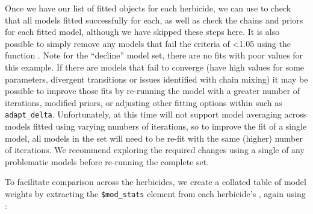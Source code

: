 \documentclass[
  shortnames]{jss}
\begin{document}
Once we have our list of fitted  objects for each herbicide, we can use  to check that all models fitted successfully for each, as well as check the chains and priors for each fitted model, although we have skipped these steps here. It is also possible to simply remove any models that fail the  criteria of \textless1.05 using the function . Note for the ``decline'' model set, there are no fits with poor  values for this example. If there are models that fail to converge (have high  values for some parameters, divergent transitions or issues identified with chain mixing) it may be possible to improve those fits by re-running the model with a greater number of iterations, modified priors, or adjusting other fitting options within  such as \texttt{adapt\_delta}. Unfortunately, at this time  will not support model averaging across models fitted using varying numbers of iterations, so to improve the fit of a single model, all models in the set will need to be re-fit with the same (higher) number of iterations. We recommend exploring the required changes using a single  of any problematic models before re-running the complete  set.

\newpage

\begin{CodeChunk}
\end{CodeChunk}

To facilitate comparison across the herbicides, we create a collated table of model weights by extracting the \texttt{\$mod\_stats} element from each herbicide's , again using :

\begin{CodeChunk}
\end{CodeChunk}
\end{document}
